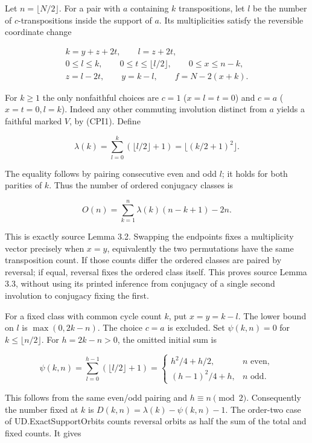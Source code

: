 Let \(n=\lfloor N/2\rfloor\). For a pair with \(a\) containing \(k\)
transpositions, let \(l\) be the number of \(c\)-transpositions inside
the support of \(a\). Its multiplicities satisfy the reversible
coordinate change

\[
 \begin{gathered}
 k=y+z+2t,\qquad l=z+2t,\\
 0\le l\le k,\qquad 0\le t\le\lfloor l/2\rfloor,\qquad0\le x\le n-k,\\
 z=l-2t,\qquad y=k-l,\qquad f=N-2(x+k).
 \end{gathered}
 \tag{CPI3}
\]

For \(k\ge1\) the only nonfaithful choices are \(c=1\) (\(x=l=t=0\)) and
\(c=a\) (\(x=t=0,l=k\)). Indeed any other commuting involution distinct
from \(a\) yields a faithful marked \(V\), by (CPI1). Define

\[
 \lambda(k)=\sum_{l=0}^k(\lfloor l/2\rfloor+1)
 =\lfloor(k/2+1)^2\rfloor.
 \tag{CPI4}
\]

The equality follows by pairing consecutive even and odd \(l\); it holds
for both parities of \(k\). Thus the number of ordered conjugacy classes
is

\[
 O(n)=\sum_{k=1}^n\lambda(k)(n-k+1)-2n.
 \tag{CPI5}
\]

This is exactly source Lemma 3.2. Swapping the endpoints fixes a
multiplicity vector precisely when \(x=y\), equivalently the two
permutations have the same transposition count. If those counts differ
the ordered classes are paired by reversal; if equal, reversal fixes the
ordered class itself. This proves source Lemma 3.3, without using its
printed inference from conjugacy of a single second involution to
conjugacy fixing the first.

For a fixed class with common cycle count \(k\), put \(x=y=k-l\). The
lower bound on \(l\) is \(\max(0,2k-n)\). The choice \(c=a\) is
excluded. Set \(\psi(k,n)=0\) for \(k\le\lfloor n/2\rfloor\). For
\(h=2k-n>0\), the omitted initial sum is

\[
 \psi(k,n)=\sum_{l=0}^{h-1}(\lfloor l/2\rfloor+1)
 =\begin{cases}h^2/4+h/2,&n\text{ even},\\(h-1)^2/4+h,&n\text{ odd}.
 \end{cases}
 \tag{CPI6}
\]

This follows from the same even/odd pairing and \(h\equiv n\pmod2\).
Consequently the number fixed at \(k\) is
\(D(k,n)=\lambda(k)-\psi(k,n)-1\). The order-two case of
UD.ExactSupportOrbits counts reversal orbits as half the sum of the
total and fixed counts. It gives

